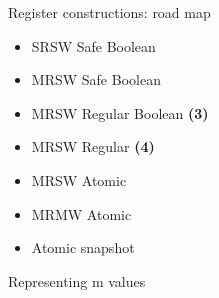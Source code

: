\begin{frame}{Register constructions: road map}

\begin{itemize}
  \item SRSW Safe Boolean 
  \item MRSW Safe Boolean 
  \item MRSW Regular Boolean \textbf{(3)}
  \item MRSW Regular \textbf{(4)}
  \item MRSW Atomic
  \item MRMW Atomic
  \item Atomic snapshot
\end{itemize}

\end{frame}

\begin{frame}{Representing m values}




\end{frame}

